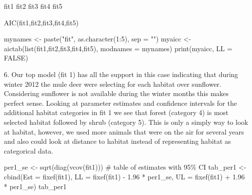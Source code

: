 \documentclass[
  letterpaper,
]{book}
\newenvironment{Shaded}{\begin{snugshade}}{\end{snugshade}}
\newcommand{\AttributeTok}[1]{\textcolor[rgb]{0.40,0.45,0.13}{#1}}
\newcommand{\CommentTok}[1]{\textcolor[rgb]{0.37,0.37,0.37}{#1}}
\newcommand{\ConstantTok}[1]{\textcolor[rgb]{0.56,0.35,0.01}{#1}}
\newcommand{\DecValTok}[1]{\textcolor[rgb]{0.68,0.00,0.00}{#1}}
\newcommand{\FloatTok}[1]{\textcolor[rgb]{0.68,0.00,0.00}{#1}}
\newcommand{\FunctionTok}[1]{\textcolor[rgb]{0.28,0.35,0.67}{#1}}
\newcommand{\NormalTok}[1]{\textcolor[rgb]{0.00,0.23,0.31}{#1}}
\newcommand{\OtherTok}[1]{\textcolor[rgb]{0.00,0.23,0.31}{#1}}
\newcommand{\SpecialCharTok}[1]{\textcolor[rgb]{0.37,0.37,0.37}{#1}}
\newcommand{\StringTok}[1]{\textcolor[rgb]{0.13,0.47,0.30}{#1}}
\begin{document}
\begin{Shaded}
\begin{Highlighting}[]
\NormalTok{fit1}
\NormalTok{fit2}
\NormalTok{fit3}
\NormalTok{fit4}
\NormalTok{fit5}

\FunctionTok{AIC}\NormalTok{(fit1,fit2,fit3,fit4,fit5)}

\NormalTok{mynames }\OtherTok{\textless{}{-}} \FunctionTok{paste}\NormalTok{(}\StringTok{"fit"}\NormalTok{, }\FunctionTok{as.character}\NormalTok{(}\DecValTok{1}\SpecialCharTok{:}\DecValTok{5}\NormalTok{), }\AttributeTok{sep =} \StringTok{""}\NormalTok{)}
\NormalTok{myaicc }\OtherTok{\textless{}{-}} \FunctionTok{aictab}\NormalTok{(}\FunctionTok{list}\NormalTok{(fit1,fit2,fit3,fit4,fit5), }\AttributeTok{modnames =}\NormalTok{ mynames)}
\FunctionTok{print}\NormalTok{(myaicc, }\AttributeTok{LL =} \ConstantTok{FALSE}\NormalTok{)}
\end{Highlighting}
\end{Shaded}

6. Our top model (fit 1) has all the support in this case indicating
that during winter 2012 the mule deer were selecting for each habitat
over sunflower. Considering sunflower is not available during the winter
months this makes perfect sense. Looking at parameter estimates and
confidence intervals for the additional habitat categories in fit 1 we
see that forest (category 4) is most selected habitat followed by shrub
(category 5). This is only a simply way to look at habitat, however, we
used more animals that were on the air for several years and also could
look at distance to habitat instead of representing habitat as
categorical data.

\begin{Shaded}
\begin{Highlighting}[]
\NormalTok{per1\_se }\OtherTok{\textless{}{-}} \FunctionTok{sqrt}\NormalTok{(}\FunctionTok{diag}\NormalTok{(}\FunctionTok{vcov}\NormalTok{(fit1)))}
\CommentTok{\# table of estimates with 95\% CI}
\NormalTok{tab\_per1 }\OtherTok{\textless{}{-}} \FunctionTok{cbind}\NormalTok{(}\AttributeTok{Est =} \FunctionTok{fixef}\NormalTok{(fit1), }\AttributeTok{LL =} \FunctionTok{fixef}\NormalTok{(fit1) }\SpecialCharTok{{-}} \FloatTok{1.96} \SpecialCharTok{*}\NormalTok{ per1\_se, }\AttributeTok{UL =} \FunctionTok{fixef}\NormalTok{(fit1)}
  \SpecialCharTok{+} \FloatTok{1.96} \SpecialCharTok{*}\NormalTok{ per1\_se)}
\NormalTok{tab\_per1}
\end{Highlighting}
\end{Shaded}
\end{document}
